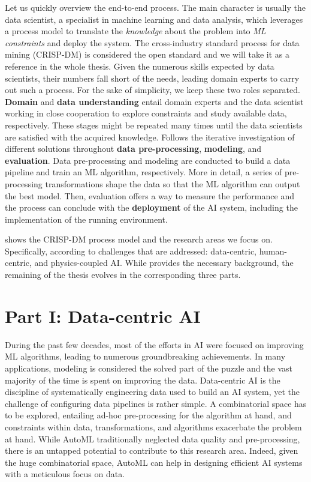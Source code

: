 Let us quickly overview the end-to-end process.
The main character is usually the data scientist, a specialist in machine learning and data analysis, which leverages a process model to translate the \textit{knowledge} about the problem into \textit{ML constraints} and deploy the system.
The cross-industry standard process for data mining (CRISP-DM) \cite{wirth2000crisp} is considered the open standard and we will take it as a reference in the whole thesis.
Given the numerous skills expected by data scientists,
their numbers fall short of the needs,
leading domain experts to carry out such a process.
For the sake of simplicity, we keep these two roles separated.
\textbf{Domain} and \textbf{data understanding} entail domain experts and the data scientist working in close cooperation to explore constraints and study available data, respectively.
These stages might be repeated many times until the data scientists are satisfied with the acquired knowledge.
Follows the iterative investigation of different solutions throughout \textbf{data pre-processing}, \textbf{modeling}, and \textbf{evaluation}.
Data pre-processing and modeling are conducted to build a data pipeline and train an ML algorithm, respectively.
More in detail, a series of pre-processing transformations shape the data so that the ML algorithm can output the best model.
Then, evaluation offers a way to measure the performance and the process can conclude with the \textbf{deployment} of the AI system, including the implementation of the running environment.

 shows the CRISP-DM process model and the research areas we focus on.
Specifically, according to challenges that are addressed: data-centric, human-centric, and physics-coupled AI.
While  provides the necessary background, the remaining of the thesis evolves in the corresponding three parts.

\section*{Part I: Data-centric AI}

During the past few decades, most of the efforts in AI were focused on improving ML algorithms, leading to numerous groundbreaking achievements.
In many applications, modeling is considered the solved part of the puzzle and the vast majority of the time is spent on improving the data.
Data-centric AI is the discipline of systematically engineering data used to build an AI system, yet the challenge of configuring data pipelines is rather simple.
A combinatorial space has to be explored, entailing ad-hoc pre-processing for the algorithm at hand, and constraints within data, transformations, and algorithms exacerbate the problem at hand.
While AutoML traditionally neglected data quality and pre-processing, there is an untapped potential to contribute to this research area.
Indeed, given the huge combinatorial space, AutoML can help in designing efficient AI systems with a meticulous focus on data.

